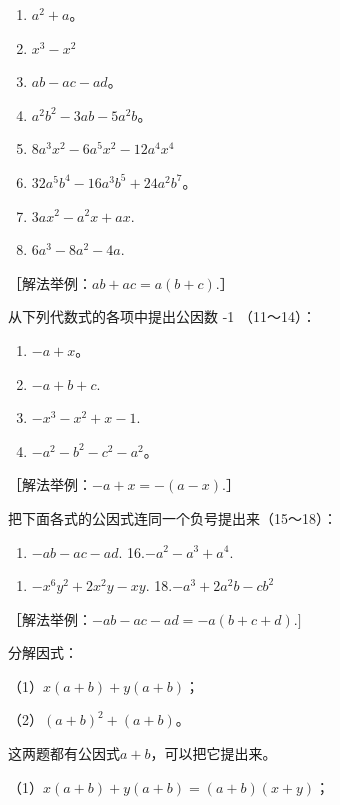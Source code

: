 \begin{enumerate}[start=3]
\item
  \(a^2 + a\)。
\item
  \(x^{3} - x^{2}\)
\item
  \(ab - ac - ad\)。
\item
  \(a^2 b^2 - 3ab - 5a^2 b\)。
\item
  \(8a^{3}x^{2} - 6a^{5}x^{2} - 12a^{4}x^{4}\)
\item
  \(32a^{5}b^{4} - 16a^{3}b^{5} + 24a^{2}b^{7}\)。
\item
  \(3ax^{2} - a^{2}x + ax.\)
\item
  \(6a^{3} - 8a^{2} - 4a.\)
\end{enumerate}

［解法举例：\(ab + ac = a(b + c)\).］

从下列代数式的各项中提出公因数 -1 （11～14）：

\begin{enumerate}[start=11]
\item
  \(-a + x\)。
\item
  \(-a + b + c.\)
\item
  \(-x^{3} - x^{2} + x - 1.\)
\item
  \(-a^{2} - b^{2} - c^{2} - a^{2}\)。
\end{enumerate}

［解法举例：\(-a+x=-(a-x)\).］

把下面各式的公因式连同一个负号提出来（15～18）：

\begin{enumerate}[start=15]
\item
  \(-ab - ac - ad.\) 16.\(-a^2 - a^3 + a^4.\)
\end{enumerate}

\begin{enumerate}[start=17]
\item
  \(-x^{6}y^{2} + 2x^{2}y - xy.\) 18.\(-a^{3} + 2a^{2}b - cb^{2}\)
\end{enumerate}

［解法举例：\(-ab - ac - ad = -a(b + c + d).]\)

 分解因式：

（1）\(x(a + b) + y(a + b)\)；

（2）\((a + b)^{2} + (a + b)\)。

 这两题都有公因式\(a + b\)，可以把它提出来。

 （1）\(x(a + b) + y(a + b) = (a + b)(x + y)\)；

